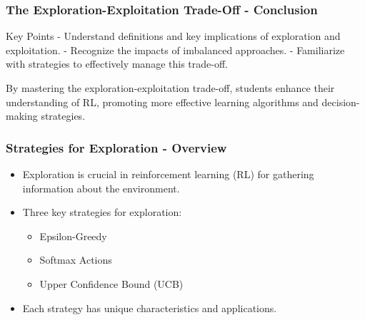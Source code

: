 \documentclass[aspectratio=169]{beamer}
\begin{document}
\begin{frame}[fragile]
    \frametitle{The Exploration-Exploitation Trade-Off - Conclusion}
    \begin{block}{Key Points}
        - Understand definitions and key implications of exploration and exploitation.
        - Recognize the impacts of imbalanced approaches.
        - Familiarize with strategies to effectively manage this trade-off.
    \end{block}
    
    By mastering the exploration-exploitation trade-off, students enhance their understanding of RL, promoting more effective learning algorithms and decision-making strategies.
\end{frame}

\begin{frame}[fragile]
    \frametitle{Strategies for Exploration - Overview}
    \begin{itemize}
        \item Exploration is crucial in reinforcement learning (RL) for gathering information about the environment.
        \item Three key strategies for exploration:
        \begin{itemize}
            \item Epsilon-Greedy
            \item Softmax Actions
            \item Upper Confidence Bound (UCB)
        \end{itemize}
        \item Each strategy has unique characteristics and applications.
    \end{itemize}
\end{frame}
\end{document}

